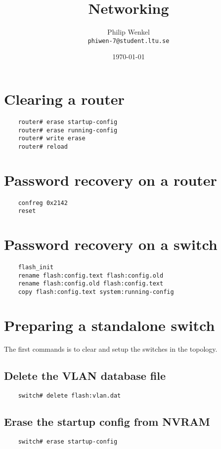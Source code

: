 \documentclass{article}
\title {
	Networking
}
\author {
	Philip Wenkel \\
	{\tt phiwen-7@student.ltu.se}
}
\date{\today}
\begin{document}
\maketitle

\newpage
\tableofcontents

\newpage

\section{Clearing a router}

\begin{verbatim}
	router# erase startup-config
	router# erase running-config
	router# write erase
	router# reload
\end{verbatim}

\section{Password recovery on a router}

\begin{verbatim}
	confreg 0x2142
	reset
\end{verbatim}

\section{Password recovery on a switch}

\begin{verbatim}
	flash_init
	rename flash:config.text flash:config.old
	rename flash:config.old flash:config.text
	copy flash:config.text system:running-config
\end{verbatim}

\section{Preparing a standalone switch}
The first commands is to clear and setup the switches in the topology.


\subsection{Delete the VLAN database file}
\begin{verbatim}
	switch# delete flash:vlan.dat
\end{verbatim}

\subsection{Erase the startup config from NVRAM}
\begin{verbatim}
	switch# erase startup-config
\end{verbatim}
\end{document}
